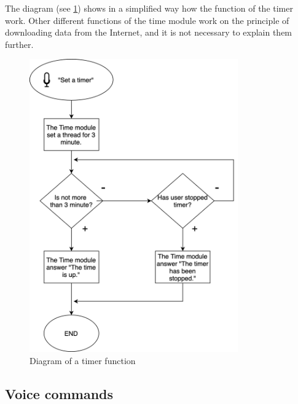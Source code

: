 

The diagram (see \cref{fig:timer_time_diagram}) shows in a simplified way how the function of the timer work. Other different functions of the time module work on the principle of downloading data from the Internet, and it is not necessary to explain them further.

\begin{figure}[H]
    \centering
    \includegraphics[width=0.8\textwidth]{img/timer_time_diagram.png}
    \caption{Diagram of a timer function}
    \label{fig:timer_time_diagram}
\end{figure}

\subsection{Voice commands}

